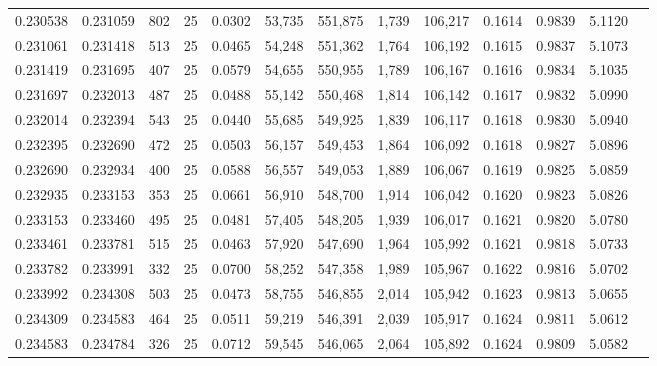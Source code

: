 \begin{tabular}{rrrrrrrrrrrrr}
0.230538 & 0.231059 &   802 &  25 &                                     0.0302 &  53,735 & 551,875 &   1,739 & 106,217 & 0.1614 & 0.9839 & 5.1120 \\
0.231061 & 0.231418 &   513 &  25 &                                     0.0465 &  54,248 & 551,362 &   1,764 & 106,192 & 0.1615 & 0.9837 & 5.1073 \\
0.231419 & 0.231695 &   407 &  25 &                                     0.0579 &  54,655 & 550,955 &   1,789 & 106,167 & 0.1616 & 0.9834 & 5.1035 \\
0.231697 & 0.232013 &   487 &  25 &                                     0.0488 &  55,142 & 550,468 &   1,814 & 106,142 & 0.1617 & 0.9832 & 5.0990 \\
0.232014 & 0.232394 &   543 &  25 &                                     0.0440 &  55,685 & 549,925 &   1,839 & 106,117 & 0.1618 & 0.9830 & 5.0940 \\
0.232395 & 0.232690 &   472 &  25 &                                     0.0503 &  56,157 & 549,453 &   1,864 & 106,092 & 0.1618 & 0.9827 & 5.0896 \\
0.232690 & 0.232934 &   400 &  25 &                                     0.0588 &  56,557 & 549,053 &   1,889 & 106,067 & 0.1619 & 0.9825 & 5.0859 \\
0.232935 & 0.233153 &   353 &  25 &                                     0.0661 &  56,910 & 548,700 &   1,914 & 106,042 & 0.1620 & 0.9823 & 5.0826 \\
0.233153 & 0.233460 &   495 &  25 &                                     0.0481 &  57,405 & 548,205 &   1,939 & 106,017 & 0.1621 & 0.9820 & 5.0780 \\
0.233461 & 0.233781 &   515 &  25 &                                     0.0463 &  57,920 & 547,690 &   1,964 & 105,992 & 0.1621 & 0.9818 & 5.0733 \\
0.233782 & 0.233991 &   332 &  25 &                                     0.0700 &  58,252 & 547,358 &   1,989 & 105,967 & 0.1622 & 0.9816 & 5.0702 \\
0.233992 & 0.234308 &   503 &  25 &                                     0.0473 &  58,755 & 546,855 &   2,014 & 105,942 & 0.1623 & 0.9813 & 5.0655 \\
0.234309 & 0.234583 &   464 &  25 &                                     0.0511 &  59,219 & 546,391 &   2,039 & 105,917 & 0.1624 & 0.9811 & 5.0612 \\
0.234583 & 0.234784 &   326 &  25 &                                     0.0712 &  59,545 & 546,065 &   2,064 & 105,892 & 0.1624 & 0.9809 & 5.0582 \\

\end{tabular}
